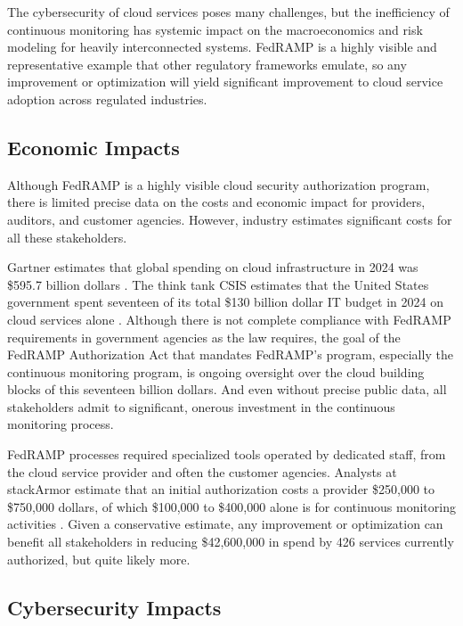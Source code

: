 \documentclass{jdf}
\begin{document}
The cybersecurity of cloud services poses many challenges, but the inefficiency of continuous monitoring has systemic impact on the macroeconomics and risk modeling for heavily interconnected systems. FedRAMP is a highly visible and representative example that other regulatory frameworks emulate, so any improvement or optimization will yield significant improvement to cloud service adoption across regulated industries.

\subsection{Economic Impacts}

Although FedRAMP is a highly visible cloud security authorization program, there is limited precise data on the costs and economic impact for providers, auditors, and customer agencies. However, industry estimates significant costs for all these stakeholders.

Gartner estimates that global spending on cloud infrastructure in 2024 was \$595.7 billion dollars \citeyear{gartner24}. The think tank CSIS estimates that the United States government spent seventeen of its total \$130 billion dollar IT budget in 2024 on cloud services alone \citeyear[p.~1]{csis25}. Although there is not complete compliance with FedRAMP requirements in government agencies as the law requires, the goal of the FedRAMP Authorization Act that mandates FedRAMP's program, especially the continuous monitoring program, is ongoing oversight over the cloud building blocks of this seventeen billion dollars. And even without precise public data, all stakeholders admit to significant, onerous investment in the continuous monitoring process.

FedRAMP processes required specialized tools operated by dedicated staff, from the cloud service provider and often the customer agencies. Analysts at stackArmor estimate that an initial authorization costs a provider \$250,000 to \$750,000 dollars, of which \$100,000 to \$400,000 alone is for continuous monitoring activities \citeyear{stackarmor24}. Given a conservative estimate, any improvement or optimization can benefit all stakeholders in reducing \$42,600,000 in spend by 426 services currently authorized, but quite likely more. 

\subsection{Cybersecurity Impacts}
\end{document}
